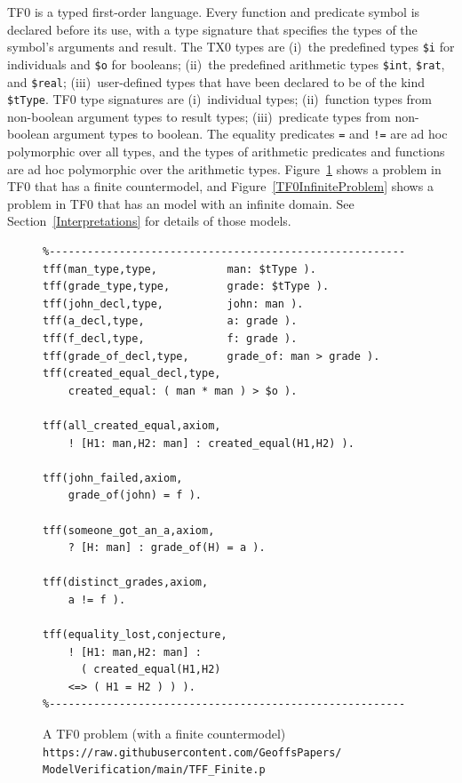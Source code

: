\documentclass[letterpaper]{article}
\newcommand{\smalltt}[1]{\small \texttt{#1}}
\begin{document}
TF0 is a typed first-order language.
Every function and predicate symbol is declared before its use, with a type signature that 
specifies the types of the symbol’s arguments and result.
The TX0 types are 
(i)~the predefined types \smalltt{\$i} for individuals and \smalltt{\$o} for booleans; 
(ii)~the predefined arithmetic types \smalltt{\$int}, \smalltt{\$rat}, and \smalltt{\$real}; 
(iii)~user-defined types that have been declared to be of the kind \smalltt{\$tType}.
TF0 type signatures are 
(i)~individual types;
(ii)~function types from non-boolean argument types to result types;
(iii)~predicate types from non-boolean argument types to boolean.
The equality predicates {\tt =} and {\tt !=} are ad hoc polymorphic over all types, and the types 
of arithmetic predicates and functions are ad hoc polymorphic over the arithmetic types.
Figure~\ref{TF0FiniteProblem} shows a problem in TF0 that has a finite countermodel, and 
Figure~\ref{TF0InfiniteProblem} shows a problem in TF0
that has an model with an infinite domain.
See Section~\ref{Interpretations} for details of those models.

\begin{figure}[htbp]
\scriptsize
{}
\begin{verbatim}
%--------------------------------------------------------
tff(man_type,type,           man: $tType ).
tff(grade_type,type,         grade: $tType ).
tff(john_decl,type,          john: man ).
tff(a_decl,type,             a: grade ).
tff(f_decl,type,             f: grade ).
tff(grade_of_decl,type,      grade_of: man > grade ).
tff(created_equal_decl,type, 
    created_equal: ( man * man ) > $o ).

tff(all_created_equal,axiom,
    ! [H1: man,H2: man] : created_equal(H1,H2) ).

tff(john_failed,axiom,
    grade_of(john) = f ).

tff(someone_got_an_a,axiom,
    ? [H: man] : grade_of(H) = a ).

tff(distinct_grades,axiom,
    a != f ).

tff(equality_lost,conjecture,
    ! [H1: man,H2: man] :
      ( created_equal(H1,H2)
    <=> ( H1 = H2 ) ) ).
%--------------------------------------------------------
\end{verbatim}
\caption{A TF0 problem (with a finite countermodel)\\
{\scriptsize {\tt https://raw.githubusercontent.com/GeoffsPapers/\\
ModelVerification/main/TFF\_Finite.p}}}
\label{TF0FiniteProblem}
\end{figure}
\end{document}
